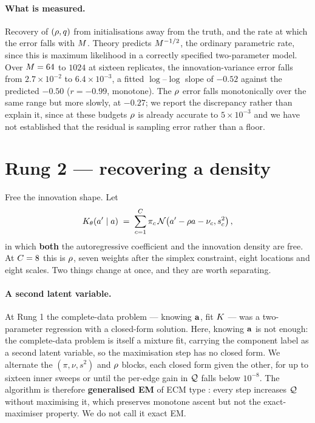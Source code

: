 \documentclass{article}
\theoremstyle{definition}
\theoremstyle{plain}
\begin{document}
\paragraph{What is measured.} Recovery of $(\rho,q)$ from initialisations away from the
truth, and the rate at which the error falls with $M$. Theory predicts $M^{-1/2}$, the
ordinary parametric rate, since this is maximum likelihood in a correctly specified
two-parameter model. Over $M=64$ to $1024$ at sixteen replicates, the innovation-variance
error falls from $2.7\times10^{-2}$ to $6.4\times10^{-3}$, a fitted $\log$--$\log$ slope of
$-0.52$ against the predicted $-0.50$ ($r=-0.99$, monotone). The $\rho$ error falls monotonically
over the same range but more slowly, at $-0.27$; we report the discrepancy rather than explain it,
since at these budgets $\rho$ is already accurate to $5\times10^{-3}$ and we have not established
that the residual is sampling error rather than a floor.

\section{Rung 2 --- recovering a density}
\label{sec:rung2}

Free the innovation shape. Let
\begin{equation}
\label{eq:kernel}
K_{\theta}(a'\mid a) \;=\; \sum_{c=1}^{C} \pi_c \,
\mathcal{N}\!\left(a' - \rho a - \nu_c,s_c^2\right),
\end{equation}
in which \textbf{both} the autoregressive coefficient and the innovation density are free. At
$C=8$ this is $\rho$, seven weights after the simplex constraint, eight locations and eight
scales. Two things change at once, and they are worth separating.

\paragraph{A second latent variable.} At Rung 1 the complete-data problem --- knowing $\mathbf{a}$, fit
$K$ --- was a two-parameter regression with a closed-form solution. Here, knowing $\mathbf{a}$ is
not enough: the complete-data problem is itself a mixture fit, carrying the component label as a
second latent variable, so the maximisation step has no closed form. We alternate the
$(\pi,\nu,s^2)$ and $\rho$ blocks, each closed form given the other, for up to sixteen inner
sweeps or until the per-edge gain in $\mathcal{Q}$ falls below $10^{-8}$. The algorithm is therefore \textbf{generalised EM} of ECM type
\citep{dempster1977maximum,meng1993maximum}: every step increases $\mathcal{Q}$ without maximising it, which preserves
monotone ascent \citep{wu1983} but not the exact-maximiser property. We do not call it exact EM.
\end{document}
